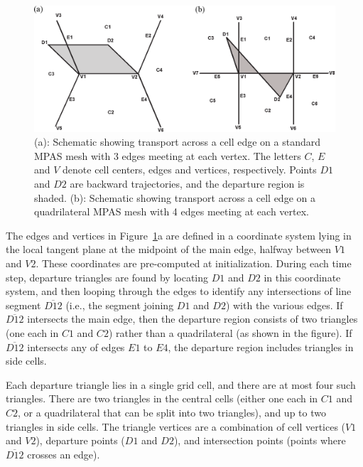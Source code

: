 \begin{figure}[]
\centering
\includegraphics[width=1.0\textwidth]{seaice/figures/ir_diagram.eps}
\caption{(a): Schematic showing transport across a cell edge on a standard MPAS mesh with 3 edges meeting at each vertex. The letters $C$, $E$ and $V$ denote cell centers, edges and vertices, respectively. Points $D1$ and $D2$ are backward trajectories, and the departure region is shaded. (b): Schematic showing transport across a cell edge on a quadrilateral MPAS mesh with 4 edges meeting at each vertex.}
\label{fig:IR_geom}
\end{figure}

The edges and vertices in Figure~\ref{fig:IR_geom}a are defined in a coordinate system lying in the local tangent plane at the midpoint of the main edge, halfway between $V1$ and $V2$. These coordinates are pre-computed at initialization. During each time step, departure triangles are found by locating $D1$ and $D2$ in this coordinate system, and then looping through the edges to identify any intersections of line segment $\overline{D12}$ (i.e., the segment joining $D1$ and $D2$) with the various edges. If $\overline{D12}$ intersects the main edge, then the departure region consists of two triangles (one each in $C1$ and $C2$) rather than a quadrilateral (as shown in the figure). If $\overline{D12}$ intersects any of edges $E1$ to $E4$, the departure region includes triangles in side cells.

Each departure triangle lies in a single grid cell, and there are at most four such triangles. There are two triangles in the central cells (either one each in $C1$ and $C2$, or a quadrilateral that can be split into two triangles), and up to two triangles in side cells. The triangle vertices are a combination of cell vertices ($V1$ and $V2$), departure points ($D1$ and $D2$), and intersection points (points where $\overline{D12}$ crosses an edge).

